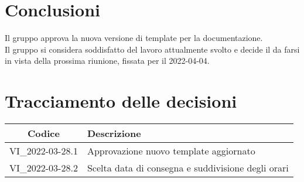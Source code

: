 \section{Conclusioni}
Il gruppo approva la nuova versione di template per la documentazione. 
\\Il gruppo si considera soddisfatto del lavoro attualmente svolto e decide il da farsi in vista della prossima riunione, fissata per il 2022-04-04.
\newpage
	 
\section*{Tracciamento delle decisioni}
	\renewcommand{\arraystretch}{1.8} %
	\begin{tabular}{ |c|l| }
		\hline
		\textbf{Codice} & \textbf{Descrizione} \\
		\hline
		VI\_2022-03-28.1 & Approvazione nuovo template aggiornato\\ %
		\hline
		VI\_2022-03-28.2 & Scelta data di consegna e suddivisione degli orari\\
		\hline
	\end{tabular}